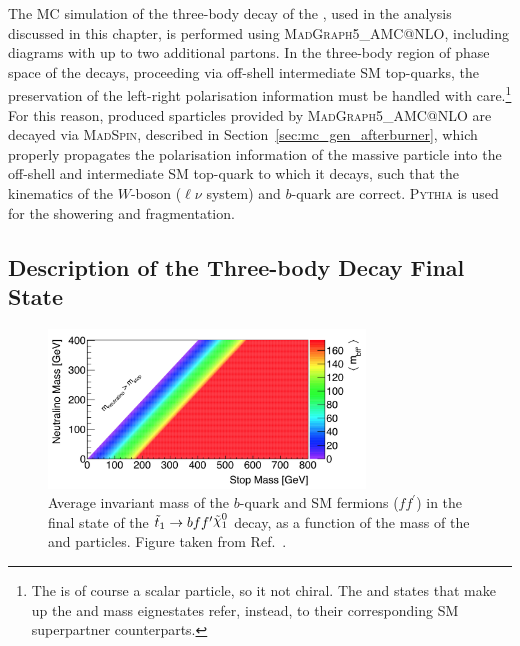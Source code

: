 The MC simulation of the three-body decay of the \stopone, used in the analysis discussed in 
this chapter, is performed using \textsc{MadGraph5\_AMC@NLO}, including diagrams with up to
two additional partons.
In the three-body region of phase space of the \stopone decays, proceeding via off-shell
intermediate SM top-quarks, the preservation of the \stopone left-right polarisation information
must be handled with care.\footnote{The
\stopone is of course a scalar particle, so it not chiral.
The \stopL and \stopR  states that make up the \stopone and \stoptwo mass eignestates refer, instead, 
to their corresponding SM superpartner counterparts.
}
For this reason, produced \stop sparticles provided by \textsc{MadGraph5\_AMC@NLO} are decayed
via \textsc{MadSpin}, described in Section~\ref{sec:mc_gen_afterburner}, which properly
propagates the polarisation information of the massive \stopone particle into the
off-shell and intermediate SM top-quark to which it decays, such that the kinematics of the
$W$-boson ($\ell \nu$ system) and $b$-quark are correct.
\textsc{Pythia} is used for the showering and fragmentation.

\subsection{Description of the Three-body Decay Final State}
\label{sec:stop_final_state}

\begin{figure}[!htb]
    \begin{center}
        \includegraphics[width=0.75\textwidth]{figures/search_stop2l/nachman_stop_phase_space}
        \caption{
            Average invariant mass of the $b$-quark and SM fermions ($f f^{\prime}$) in the
            final state of the $\stopone \rightarrow b f f^{\prime} \ninoone$ decay, as a function of the mass
            of the \stopone and \ninoone particles.
            Figure taken from Ref.~\cite{Nachman:2016qyc}.
        }
        \label{fig:stop_phase_space}
    \end{center}
\end{figure}

